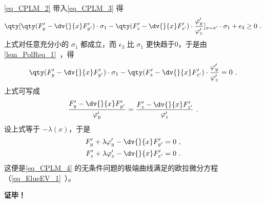 \autoref{eq_CPLM_2} 带入\autoref{eq_CPLM_3} 得
\begin{equation}
\qty[\qty(F'_y-\dv{}{x}F'_{y'})\cdot\sigma_1-\qty(F'_z-\dv{}{x}F'_{z'})\cdot\frac{\varphi'_y}{\varphi'_z}]_{x=x'}\cdot\sigma_1+\epsilon_3\geq0~.
\end{equation}
上式对任意充分小的 $\sigma_1$ 都成立，而 $\epsilon_3$ 比 $\sigma_1$ 更快趋于0，于是由\autoref{lem_PolReq_1}~，得
\begin{equation}
\qty(F'_y-\dv{}{x}F'_{y'})\cdot\sigma_1-\qty(F'_z-\dv{}{x}F'_{z'})\cdot\frac{\varphi'_y}{\varphi'_z}=0~.
\end{equation}
上式可写成
\begin{equation}
\frac{F'_y-\dv{}{x}F'_{y'}}{\varphi'_y}=\frac{F'_z-\dv{}{x}F'_{z'}}{\varphi'_z}~.
\end{equation}
设上式等于 $-\lambda(x)$，于是
\begin{equation}
\begin{aligned}
F'_y+\lambda\varphi'_y-\dv{}{x}F'_{y'}=0~,\\
F'_z+\lambda\varphi'_z-\dv{}{x}F'_{z'}=0~.
\end{aligned}
\end{equation}
这便是\autoref{eq_CPLM_4} 的无条件问题的极端曲线满足的欧拉微分方程（\autoref{eq_ElueEV_1}~）。



\textbf{证毕！}